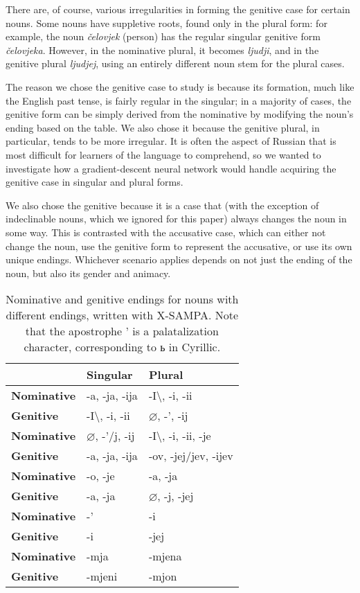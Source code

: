 \documentclass[11pt,a4paper]{article}
\begin{document}
There are, of course, various irregularities in forming the genitive case
for certain nouns. Some nouns have suppletive roots, found only in the
plural form: for example, the noun \emph{\v{c}elovjek} (person) has the regular singular 
genitive form \emph{\v{c}elovjeka}. However, in the nominative plural, it becomes
\emph{ljudji}, and in the genitive plural \emph{ljudjej}, using an entirely different
noun stem for the plural cases.

The reason we chose the genitive case to study is because its formation,
much like the English past tense, is fairly regular in the singular; in a majority of cases,
the genitive form can be simply derived from the nominative by modifying the
noun's ending based on the table. We also chose it because the genitive plural,
in particular, tends to be more irregular. It is often the aspect of Russian
that is most difficult for learners of the language to comprehend, so
we wanted to investigate how a gradient-descent neural network would handle
acquiring the genitive case in singular and plural forms.

We also chose the genitive because it is a case that (with the exception of
indeclinable nouns, which we ignored for this paper) always changes the noun
in some way. This is contrasted with the accusative case, which can either
not change the noun, use the genitive form to represent the accusative, or 
use its own unique endings. Whichever scenario applies depends on not just 
the ending of the noun, but also its gender and animacy.

\begin{table}[t!]
\begin{center}
\begin{tabular}{|l|l|l}
\hline & \textbf{Singular} & \textbf{Plural} \\ \hline
\textbf{Nominative} & -a, -ja, -ija & -I\textbackslash, -i, -ii \\
\textbf{Genitive} & -I\textbackslash, -i, -ii & $\varnothing$, -', -ij \\ \hline
\textbf{Nominative} & $\varnothing$, -'/j, -ij & -I\textbackslash, -i, -ii, -je \\
\textbf{Genitive} & -a, -ja, -ija & -ov, -jej/jev, -ijev \\ \hline
\textbf{Nominative} & -o, -je & -a, -ja \\
\textbf{Genitive} & -a, -ja & $\varnothing$, -j, -jej \\ \hline
\textbf{Nominative} & -' & -i \\
\textbf{Genitive} & -i & -jej \\ \hline
\textbf{Nominative} & -mja & -mjena \\
\textbf{Genitive} & -mjeni & -mjon \\ \hline
\end{tabular}
\end{center}
\caption{\label{declension} Nominative and genitive endings for nouns with different endings, written with X-SAMPA. Note that the apostrophe ' is a palatalization character, corresponding to \foreignlanguage{russian}{ь} in Cyrillic. }
\end{table}
\end{document}
